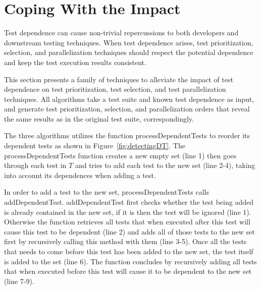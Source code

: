 \section{Coping With the Impact}
\label{sec:cope}

Test dependence can cause non-trivial repercussions
to both developers and downstream testing techniques.
When test dependence arises, test prioritization,
selection, and parallelization techniques
should respect the potential dependence and keep the
test execution results consistent.

This section presents a family of techniques to alleviate the
impact of test dependence on test prioritization, test
selection, and test parallelization techniques. All algorithms
take a test suite and known test dependence as input, and
generate test prioritization, selection, and parallelization orders
that reveal the same results as in the original
test suite, correspondingly.


The three algorithms utilizes the function processDependentTests
to reorder its dependent tests as shown in Figure~\ref{fig:detectingDT}.
The processDependentTests function creates a new empty set (line 1)
then goes through each test in $\mathit{T}$ and tries to add each
test to the new set (line 2-4), taking into account its dependences
when adding a test. 


In order to add a test to the new set, processDependentTests calls
addDependentTest. addDependentTest first checks whether the test
being added is already contained in the new set, if it is then the
test will be ignored (line 1). Otherwise the function retrieves all
tests that when executed after this test will cause this test to be
dependent (line 2) and adds all of those tests to the new set first
by recursively calling this method with them (line 3-5). Once all
the tests that needs to come before this test has been added to
the new set, the test itself is added to the set (line 6). The
function concludes by recursively adding all tests that when executed
before this test will cause it to be dependent to the new set (line 7-9).     




